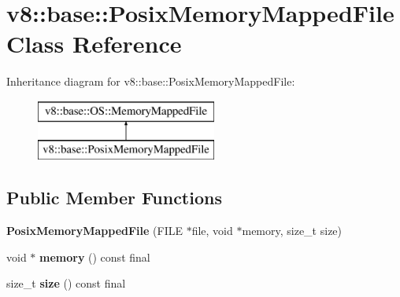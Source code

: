 \hypertarget{classv8_1_1base_1_1_posix_memory_mapped_file}{}\section{v8\+:\+:base\+:\+:Posix\+Memory\+Mapped\+File Class Reference}
\label{classv8_1_1base_1_1_posix_memory_mapped_file}
Inheritance diagram for v8\+:\+:base\+:\+:Posix\+Memory\+Mapped\+File\+:\begin{figure}[H]
\begin{center}
\leavevmode
\includegraphics[height=2.000000cm]{classv8_1_1base_1_1_posix_memory_mapped_file}
\end{center}
\end{figure}
\subsection*{Public Member Functions}
\begin{DoxyCompactItemize}
\item 
{\bfseries Posix\+Memory\+Mapped\+File} (F\+I\+LE $\ast$file, void $\ast$memory, size\+\_\+t size)\hypertarget{classv8_1_1base_1_1_posix_memory_mapped_file_aebe18d4ffe0c1ca03d0362bb07cf112e}{}\label{classv8_1_1base_1_1_posix_memory_mapped_file_aebe18d4ffe0c1ca03d0362bb07cf112e}

\item 
void $\ast$ {\bfseries memory} () const  final\hypertarget{classv8_1_1base_1_1_posix_memory_mapped_file_a6233c83de732b258255830f4674f6803}{}\label{classv8_1_1base_1_1_posix_memory_mapped_file_a6233c83de732b258255830f4674f6803}

\item 
size\+\_\+t {\bfseries size} () const  final\hypertarget{classv8_1_1base_1_1_posix_memory_mapped_file_a529abc07ed9d099cf275a0a25e5dbbd3}{}\label{classv8_1_1base_1_1_posix_memory_mapped_file_a529abc07ed9d099cf275a0a25e5dbbd3}

\end{DoxyCompactItemize}
